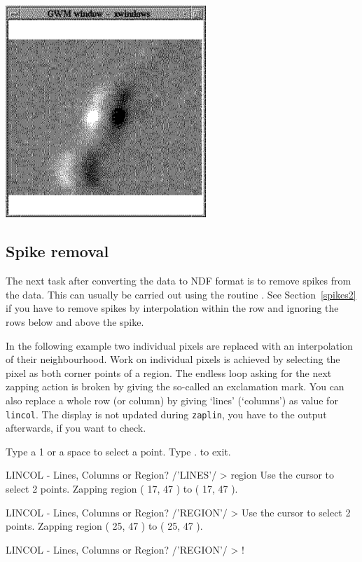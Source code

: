\documentclass[11pt,noabs]{starlink}
\begin{document}
\begin{terminalv}
\end{terminalv}

\begin{center}
\leavevmode\includegraphics[height=80mm]{sc1_display1}
\end{center}

\subsection{\label{spikes}Spike removal}



   The next task after converting the data to NDF format
   is to remove spikes from the data. This can usually
   be carried out using the routine
\texttt{}.
   See
Section~\ref{spikes2}
   if you have to remove spikes by interpolation within the row and
   ignoring the rows below and above the spike.

   In the following example two individual pixels are replaced with an
   interpolation of their neighbourhood. Work on individual pixels is
   achieved by selecting the pixel as both corner points of a region.
   The endless loop asking for the next zapping action is broken by
   giving the so-called
   an exclamation mark. You can also
   replace a whole row (or column) by giving `lines' (`columns') as
   value for \texttt{lincol}. The display is not updated during
   \texttt{zaplin}, you
   have to
\texttt{}
   the output afterwards, if you want to check.

\begin{terminalv}

Type a 1 or a space to select a point.
Type . to exit.

LINCOL - Lines, Columns or Region? /'LINES'/ > region
Use the cursor to select 2 points.
Zapping region ( 17, 47 ) to ( 17, 47 ).

LINCOL - Lines, Columns or Region? /'REGION'/ >
Use the cursor to select 2 points.
Zapping region ( 25, 47 ) to ( 25, 47 ).

LINCOL - Lines, Columns or Region? /'REGION'/ > !
\end{terminalv}
\end{document}
